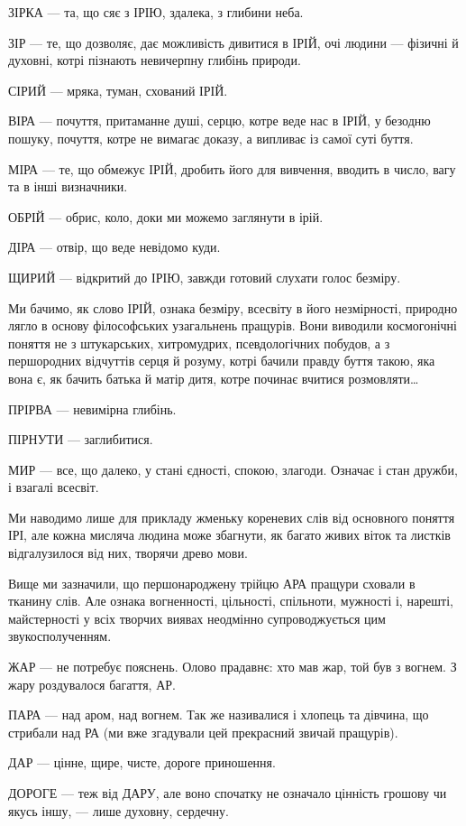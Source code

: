 ЗІРКА — та, що сяє з ІРІЮ, здалека, з глибини неба.

ЗІР — те, що дозволяє, дає можливість дивитися в ІРІЙ, очі людини — фізичні й духовні, котрі пізнають невичерпну глибінь природи.

СІРИЙ — мряка, туман, схований ІРІЙ.

ВІРА — почуття, притаманне душі, серцю, котре веде нас в ІРІЙ, у безодню пошуку, почуття, котре не вимагає доказу, а випливає із самої суті буття.

МІРА — те, що обмежує ІРІЙ, дробить його для вивчення, вводить в число, вагу та в інші визначники.

ОБРІЙ — обрис, коло, доки ми можемо заглянути в ірій.

ДІРА — отвір, що веде невідомо куди.

ЩИРИЙ — відкритий до ІРІЮ, завжди готовий слухати голос безміру.

Ми бачимо, як слово ІРІЙ, ознака безміру, всесвіту в його незмірності, природно
лягло в основу філософських узагальнень пращурів. Вони виводили космогонічні
поняття не з штукарських, хитромудрих, псевдологічних побудов, а з першородних
відчуттів серця й розуму, котрі бачили правду буття такою, яка вона є, як
бачить батька й матір дитя, котре починає вчитися розмовляти…

ПРІРВА — невимірна глибінь.

ПІРНУТИ — заглибитися.

МИР — все, що далеко, у стані єдності, спокою, злагоди. Означає і стан дружби, і взагалі всесвіт.

Ми наводимо лише для прикладу жменьку кореневих слів від основного поняття ІРІ, але кожна мисляча людина може збагнути, як багато живих віток та листків відгалузилося від них, творячи древо мови.

Вище ми зазначили, що першонароджену трійцю АРА пращури сховали в тканину слів. Але ознака вогненності, цільності, спільноти, мужності і, нарешті, майстерності у всіх творчих виявах неодмінно супроводжується цим звукосполученням.

ЖАР — не потребує пояснень. Олово прадавнє: хто мав жар, той був з вогнем. З жару роздувалося багаття, АР.

ПАРА — над аром, над вогнем. Так же називалися і хлопець та дівчина, що стрибали над РА (ми вже згадували цей прекрасний звичай пращурів).

ДАР — цінне, щире, чисте, дороге приношення.

ДОРОГЕ — теж від ДАРУ, але воно спочатку не означало цінність грошову чи якусь
іншу, — лише духовну, сердечну.

